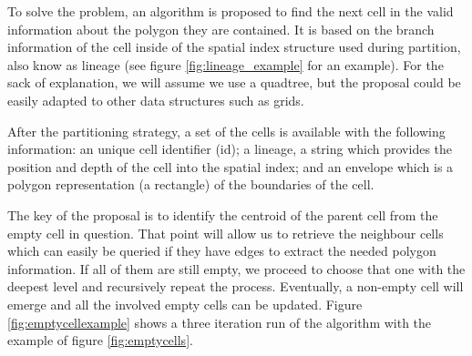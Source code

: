To solve the problem, an algorithm is proposed to find the next cell in the valid information about the polygon they are contained.  It is based on the branch information of the cell inside of the spatial index structure used during partition, also know as lineage (see figure \ref{fig:lineage_example} for an example).  For the sack of explanation, we will assume we use a quadtree, but the proposal could be easily adapted to other data structures such as grids.

After the partitioning strategy, a set of the cells is available with the following information: an unique cell identifier (id); a lineage, a string which provides the position and depth of the cell into the spatial index; and an envelope which is a polygon representation (a rectangle) of the boundaries of the cell.

The key of the proposal is to identify the centroid of the parent cell from the empty cell in question.  That point will allow us to retrieve the neighbour cells which can easily be queried if they have edges to extract the needed polygon information.  If all of them are still empty, we proceed to choose that one with the deepest level and recursively repeat the process.  Eventually, a non-empty cell will emerge and all the involved empty cells can be updated.  Figure \ref{fig:emptycellexample} shows a three iteration run of the algorithm with the example of figure \ref{fig:emptycells}.

